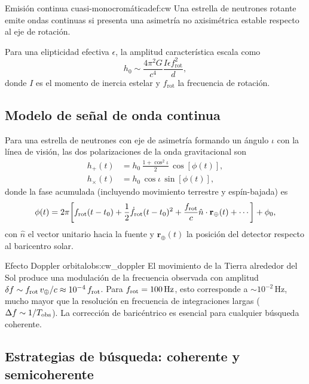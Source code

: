 \begin{definicion}{Emisión continua cuasi-monocromática}{def:cw}
Una estrella de neutrones rotante emite ondas continuas si presenta una asimetría no axisimétrica estable respecto al eje de rotación.
\end{definicion}

Para una elipticidad efectiva $\epsilon$, la amplitud característica escala como
\begin{equation}
h_0 \sim \frac{4\pi^2 G}{c^4}\frac{I\epsilon f_{\mathrm{rot}}^2}{d},
\end{equation}
donde $I$ es el momento de inercia estelar y $f_{\mathrm{rot}}$ la frecuencia de rotación.

\subsection{Modelo de señal de onda continua}

Para una estrella de neutrones con eje de asimetría formando un ángulo $\iota$ con la línea de visión, las dos polarizaciones de la onda gravitacional son
\begin{align}
  h_+(t) &= h_0\,\frac{1+\cos^2\iota}{2}\,\cos[\phi(t)], \\
  h_\times(t) &= h_0\,\cos\iota\,\sin[\phi(t)],
\end{align}
donde la fase acumulada (incluyendo movimiento terrestre y espín-bajada) es
\begin{equation}
  \phi(t) = 2\pi\!\left[f_{\rm rot}(t-t_0)
    + \frac{1}{2}\dot{f}_{\rm rot}(t-t_0)^2
    + \frac{f_{\rm rot}}{c}\hat{n}\cdot\mathbf{r}_{\oplus}(t)
    + \cdots\right] + \phi_0,
  \label{eq:cw_phase}
\end{equation}
con $\hat{n}$ el vector unitario hacia la fuente y $\mathbf{r}_\oplus(t)$ la posición del detector respecto al baricentro solar.

\begin{observacion}{Efecto Doppler orbital}{obs:cw_doppler}
El movimiento de la Tierra alrededor del Sol produce una modulación de la frecuencia observada con amplitud $\delta f \sim f_{\rm rot}\,v_\oplus/c \approx 10^{-4}\,f_{\rm rot}$. Para $f_{\rm rot}=100\,\mathrm{Hz}$, esto corresponde a $\sim 10^{-2}\,\mathrm{Hz}$, mucho mayor que la resolución en frecuencia de integraciones largas ($\Delta f \sim 1/T_{\rm obs}$). La corrección de baricéntrico es esencial para cualquier búsqueda coherente.
\end{observacion}

\subsection{Estrategias de búsqueda: coherente y semicoherente}

